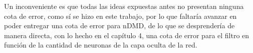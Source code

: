 Un inconveniente es que todas las ideas expuestas antes no presentan ninguna cota de error, como sí se hizo en este trabajo, por lo que faltaría avanzar en poder entregar una cota de error para nDMD, de lo que se desprendería de manera directa, con lo hecho en el capítulo 4, una cota de error para el filtro en función de la cantidad de neuronas de la capa oculta de la red.